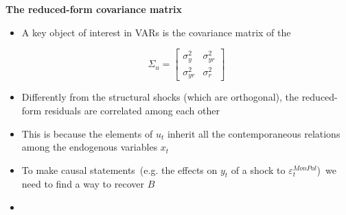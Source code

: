 \begin{frame}
{\textbf{The reduced-form covariance matrix}}

\begin{itemize}
\item A key object of interest in VARs is the covariance matrix of the {%
} 
\begin{equation*}
\Sigma _{u}=\left[ 
\begin{array}{cc}
\sigma _{y}^{2} & \sigma _{yr}^{2} \\ 
\sigma _{yr}^{2} & \sigma _{r}^{2}%
\end{array}%
\right]
\end{equation*}
\vspace{-.1cm}

\item Differently from the structural shocks (which are orthogonal), the
reduced-form residuals are correlated among each other\bigskip

\item This is because the elements of $u_{t}$ inherit all the
contemporaneous relations among the endogenous variables $x_{t}$\bigskip

\item To make causal statements\ (e.g. the effects on $y_{t}$ of a shock to $%
\varepsilon _{t}^{MonPol}$)\ we need to find a way to recover $B$\pause %
\bigskip

\item {%
}
\end{itemize}

\end{frame}


